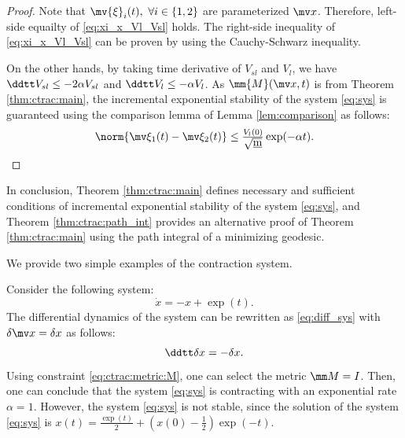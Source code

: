 \begin{proof}
    Note that $\mv{\xi}_i(t),\ \forall i\in\{1,2\}$ are parameterized $\bdx$.
    Therefore, left-side equailty of \eqref{eq:xi_x_Vl_Vsl} holds.
    The right-side inequality of \eqref{eq:xi_x_Vl_Vsl} can be proven by using the Cauchy-Schwarz inequality.

    On the other hands, by taking time derivative of $V_{sl}$ and $V_l$, we have $\ddtt V_{sl} \le -2\alpha V_{sl}$ and $\ddtt V_l \le -\alpha V_l$.
    As $\mm{M}(\bdx,t)$ is from Theorem \ref{thm:ctrac:main}, the incremental exponential stability of the system \eqref{eq:sys} is guaranteed using the comparison lemma of Lemma \ref{lem:comparison} as follows: 
    \begin{equation}
        \norm{\mv\xi_1(t)-\mv\xi_2(t)}
        \le
        \tfrac{V_{l}(0)}{\sqrt{\underbar{m}}} \exp(-\alpha t)
        .
    \end{equation}
\end{proof}

In conclusion, Theorem \ref{thm:ctrac:main} defines necessary and sufficient conditions of incremental exponential stability of the system \eqref{eq:sys}, and Theorem \ref{thm:ctrac:path_int} provides an alternative proof of Theorem \ref{thm:ctrac:main} using the path integral of a minimizing geodesic.

\hfill

We provide two simple examples of the contraction system.

\begin{example}
    Consider the following system:
    \begin{equation}
        \dot x = -x +\exp(t)
        .
    \end{equation}
    The differential dynamics of the system can be rewritten as \eqref{eq:diff_sys} with $\delta\bdx=\delta x$ as follows:
    \begin{equation}
        \ddtt\delta x
        =
        -\delta x
        .
    \end{equation}
    Using constraint \eqref{eq:ctrac:metric:M}, one can select the metric $\mm M=I$.
    Then, one can conclude that the system \eqref{eq:sys} is contracting with an exponential rate $\alpha=1$.
    However, the system \eqref{eq:sys} is not stable, since the solution of the system \eqref{eq:sys} is $x(t) = \tfrac{\exp(t)}{2}+(x(0)-\tfrac{1}{2})\exp(-t)$.
    \label{ex:div}
\end{example}

